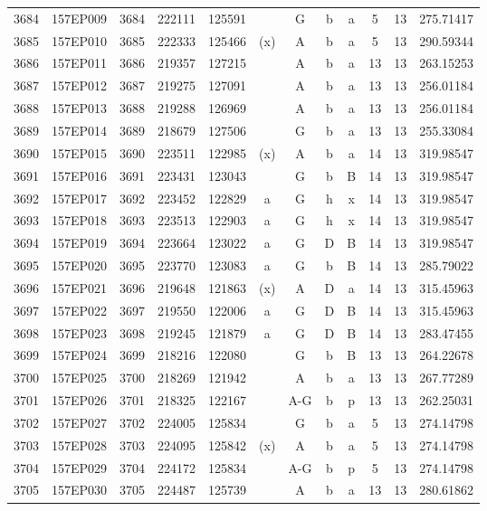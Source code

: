 \begin{tabular}{|*{12}{c|}}
3684 & 157EP009 & 3684 & 222111 & 125591 &  & G & b & a & 5 & 13 & 275.71417 \\ 
3685 & 157EP010 & 3685 & 222333 & 125466 & (x) & A & b & a & 5 & 13 & 290.59344 \\ 
3686 & 157EP011 & 3686 & 219357 & 127215 &  & A & b & a & 13 & 13 & 263.15253 \\ 
3687 & 157EP012 & 3687 & 219275 & 127091 &  & A & b & a & 13 & 13 & 256.01184 \\ 
3688 & 157EP013 & 3688 & 219288 & 126969 &  & A & b & a & 13 & 13 & 256.01184 \\ 
3689 & 157EP014 & 3689 & 218679 & 127506 &  & G & b & a & 13 & 13 & 255.33084 \\ 
3690 & 157EP015 & 3690 & 223511 & 122985 & (x) & A & b & a & 14 & 13 & 319.98547 \\ 
3691 & 157EP016 & 3691 & 223431 & 123043 &  & G & b & B & 14 & 13 & 319.98547 \\ 
3692 & 157EP017 & 3692 & 223452 & 122829 & a & G & h & x & 14 & 13 & 319.98547 \\ 
3693 & 157EP018 & 3693 & 223513 & 122903 & a & G & h & x & 14 & 13 & 319.98547 \\ 
3694 & 157EP019 & 3694 & 223664 & 123022 & a & G & D & B & 14 & 13 & 319.98547 \\ 
3695 & 157EP020 & 3695 & 223770 & 123083 & a & G & b & B & 14 & 13 & 285.79022 \\ 
3696 & 157EP021 & 3696 & 219648 & 121863 & (x) & A & D & a & 14 & 13 & 315.45963 \\ 
3697 & 157EP022 & 3697 & 219550 & 122006 & a & G & D & B & 14 & 13 & 315.45963 \\ 
3698 & 157EP023 & 3698 & 219245 & 121879 & a & G & D & B & 14 & 13 & 283.47455 \\ 
3699 & 157EP024 & 3699 & 218216 & 122080 &  & G & b & B & 13 & 13 & 264.22678 \\ 
3700 & 157EP025 & 3700 & 218269 & 121942 &  & A & b & a & 13 & 13 & 267.77289 \\ 
3701 & 157EP026 & 3701 & 218325 & 122167 &  & A-G & b & p & 13 & 13 & 262.25031 \\ 
3702 & 157EP027 & 3702 & 224005 & 125834 &  & G & b & a & 5 & 13 & 274.14798 \\ 
3703 & 157EP028 & 3703 & 224095 & 125842 & (x) & A & b & a & 5 & 13 & 274.14798 \\ 
3704 & 157EP029 & 3704 & 224172 & 125834 &  & A-G & b & p & 5 & 13 & 274.14798 \\ 
3705 & 157EP030 & 3705 & 224487 & 125739 &  & A & b & a & 13 & 13 & 280.61862 \\ 

\end{tabular}

